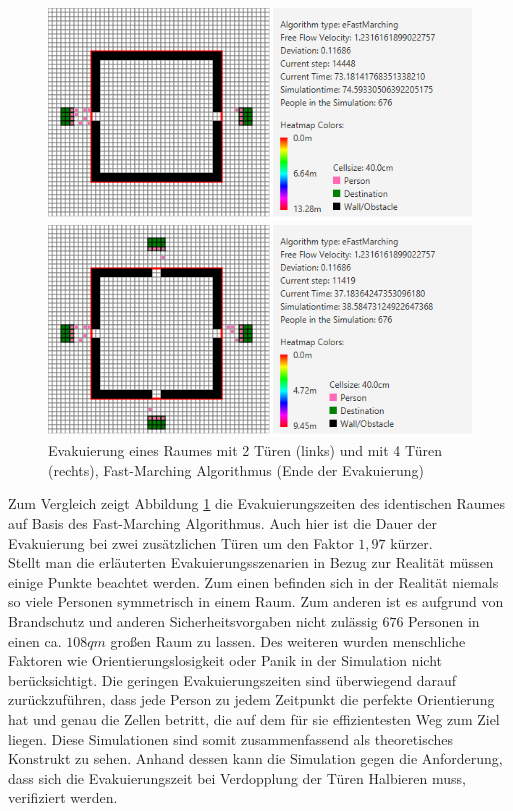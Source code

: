\begin{figure}[!htb]
	\centering
	\begin{minipage}{.5\textwidth}
		\centering
		\includegraphics[width=\textwidth]{abbildungen/Evak2TuerenEndeFM.PNG}

	\end{minipage}%
	\begin{minipage}{0.5\textwidth}
		\centering
		\includegraphics[width=\textwidth]{abbildungen/Evak4TuerenEndeFM.PNG}
	\end{minipage}
	\caption{Evakuierung eines Raumes mit 2 Türen (links) und mit 4 Türen (rechts), Fast-Marching Algorithmus (Ende der Evakuierung)}
	\label{fig:Eva2T4TEndeFM}
	\end{figure}

Zum Vergleich zeigt Abbildung \ref{fig:Eva2T4TEndeFM} die Evakuierungszeiten des identischen Raumes auf Basis des Fast-Marching Algorithmus. Auch hier ist die Dauer der Evakuierung bei zwei zusätzlichen Türen um den Faktor $1,97$ kürzer.\\

Stellt man die erläuterten Evakuierungsszenarien in Bezug zur Realität müssen einige Punkte beachtet werden. Zum einen befinden sich in der Realität niemals so viele Personen symmetrisch in einem Raum. Zum anderen ist es aufgrund von Brandschutz und anderen Sicherheitsvorgaben nicht zulässig $676$ Personen in einen ca. $108qm$ großen Raum zu lassen. Des weiteren wurden menschliche Faktoren wie Orientierungslosigkeit oder Panik in der Simulation nicht berücksichtigt. Die geringen Evakuierungszeiten sind überwiegend darauf zurückzuführen, dass jede Person zu jedem Zeitpunkt die perfekte Orientierung hat und genau die Zellen betritt, die auf dem für sie effizientesten Weg zum Ziel liegen. Diese Simulationen sind somit zusammenfassend als theoretisches Konstrukt zu sehen. Anhand dessen kann die Simulation gegen die Anforderung, dass sich die Evakuierungszeit bei Verdopplung der Türen Halbieren muss, verifiziert werden.

